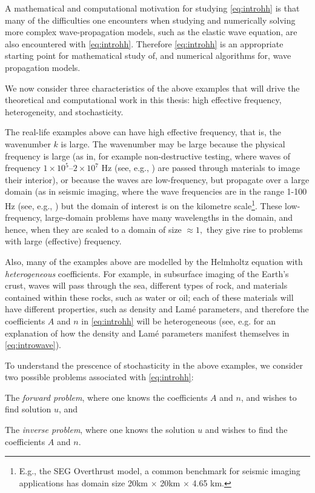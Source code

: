 A mathematical and computational motivation for studying \eqref{eq:introhh} is that many of the difficulties one encounters when studying and numerically solving more complex wave-propagation models, such as the elastic wave equation, are also encountered with \eqref{eq:introhh}. Therefore \eqref{eq:introhh} is an appropriate starting point for mathematical study of, and numerical algorithms for, wave propagation models.

We now consider three characteristics of the above examples that will drive the theoretical and computational work in this thesis: high effective frequency, heterogeneity, and stochasticity.

The real-life examples above can have high effective frequency, that is, the wavenumber $k$ is large. The wavenumber may be large because the physical frequency is large (as in, for example non-destructive testing, where waves of frequency $1\times10^5$--$2\times10^7$ Hz (see, e.g., \cite{Bi}) are passed through materials to image their interior), or because the waves are low-frequency, but propagate over a large domain (as in seismic imaging, where the wave frequencies are in the range 1-100 Hz (see, e.g., \cite{Sc}) but the domain of interest is on the kilometre scale\footnote{E.g., the SEG Overthrust model, a common benchmark for seismic imaging applications has domain size 20km $\times$ 20km $\times$ 4.65 km.}. These low-frequency, large-domain problems have many wavelengths in the domain, and hence, when they are scaled to a domain of size $\approx 1,$ they give rise to problems with large (effective) frequency.

Also, many of the examples above are modelled by the Helmholtz equation with \emph{heterogeneous} coefficients. For example, in subsurface imaging of the Earth's crust, waves will pass through the sea, different types of rock, and materials contained within these rocks, such as water or oil; each of these materials will have different properties, such as density and Lam\'e parameters, and therefore the coefficients $A$ and $n$ in \eqref{eq:introhh} will be heterogeneous (see, e.g. \cite[Section 1.2.4]{Ch:15} for an explanation of how the density and Lam\'e parameters manifest themselves in \eqref{eq:introwave}).

To understand the prescence of stochasticity in the above examples, we consider two possible problems associated with \eqref{eq:introhh}:
\ben
\item The \emph{forward problem}, where one knows the coefficients $A$ and $n$, and wishes to find solution $u$, and
\item The \emph{inverse problem}, where one knows the solution $u$ and wishes to find the coefficients $A$ and $n$.
  \een

